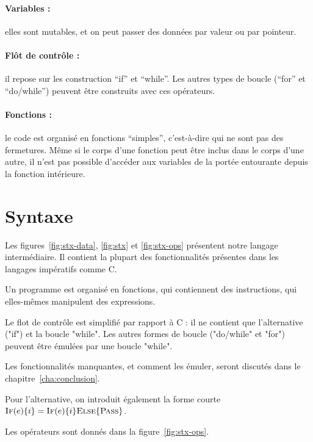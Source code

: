 \paragraph{Variables :} elles sont mutables, et on peut passer des données par
valeur ou par pointeur.

\paragraph{Flôt de contrôle :} il repose sur les construction ``if'' et
``while''. Les autres types de boucle (``for'' et ``do/while'') peuvent être
construits avec ces opérateurs.

\paragraph{Fonctions :} le code est organisé en fonctions ``simples'',
c'est-à-dire qui ne sont pas des fermetures. Même si le corps
d'une fonction peut être inclus dans le corps d'une autre, il n'est pas possible
d'accéder aux variables de la portée entourante depuis la fonction intérieure.

\section{Syntaxe}

Les figures~\ref{fig:stx-data}, \ref{fig:stx} et \ref{fig:stx-ops} présentent
notre langage intermédiaire. Il contient la plupart des fonctionnalités
présentes dans les langages impératifs comme C.

Un programme est organisé en fonctions, qui contiennent des instructions, qui
elles-mêmes manipulent des expressions.

Le flot de contrôle est simplifié par rapport à C : il ne contient que
l'alternative ("if") et la boucle "while". Les autres formes de boucle
("do/while" et "for") peuvent être émulées par une boucle "while".

Les fonctionnalités manquantes, et comment les émuler, seront discutés dans le
chapitre~\ref{cha:conclusion}. %

Pour l'alternative, on introduit également la forme courte $\textsc{If}(e) \{ i \} =
\textsc{If}(e) \{ i \} \textsc{Else} \{ \textsc{Pass} \}$.

Les opérateurs sont donnés dans la figure~\ref{fig:stx-ops}.


